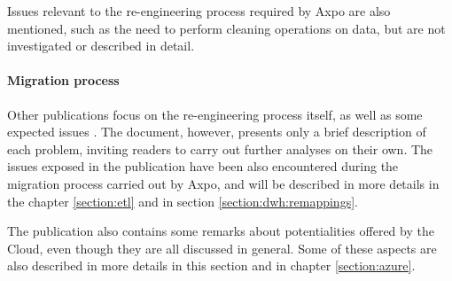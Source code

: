    Issues relevant to the re-engineering process required by Axpo are also mentioned, such as the need to perform cleaning operations on data, but are not investigated or described in detail.

\paragraph{Migration process}
    Other publications focus on the re-engineering process itself, as well as some expected issues \cite{bib:related_work:books:migration}.
    The document, however, presents only a brief description of each problem, inviting readers to carry out further analyses on their own.
    The issues exposed in the publication have been also encountered during the migration process carried out by Axpo, and will be described in more details in the chapter \ref{section:etl} and in section \ref{section:dwh:remappings}.
    
    The publication also contains some remarks about potentialities offered by the Cloud, even though they are all discussed in general.
    Some of these aspects are also described in more details in this section and in chapter \ref{section:azure}.
    
